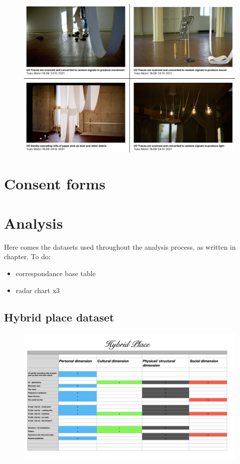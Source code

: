 \begin{figure}[H]
\includegraphics[width=13cm]{pictures/dataset/yuko_mohri.png}
\centering 
\end{figure}

\section{Consent forms}

\section{Analysis}
Here comes the datasets used throughout the analysis process, as written in chapter. To do:

\begin{itemize}
    \item correspondance base table
    \item radar chart x3
\end{itemize}



\subsection{Hybrid place dataset}
\begin{figure}[H]
\includegraphics[width=13cm]{pictures/appendix/table_hybridplace.png}
\centering 
\end{figure}

